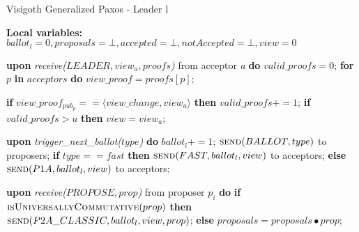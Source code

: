 \begin{algorithm} 
	\caption{Visigoth Generalized Paxos - Leader l}
	\label{VFT-Lead}
	\textbf{Local variables:} $ballot_l = 0,proposals = \bot, accepted = \bot, notAccepted = \bot, view = 0$
	\begin{algorithmic}[1]
		\State \textbf{upon} \textit{receive($LEADER,view_a,proofs$)} from acceptor \textit{a} \textbf{do}
		\State \hspace{\algorithmicindent} $valid\_proofs = 0$;
		\State \hspace{\algorithmicindent} \textbf{for} $p$ \textbf{in} $acceptors$ \textbf{do} 
		\State \hspace{\algorithmicindent}\hspace{\algorithmicindent} $view\_proof = proofs[p]$;
		
		\State \hspace{\algorithmicindent}\hspace{\algorithmicindent} \textbf{if} $view\_proof_{pub_p} == \langle view\_change, view_a \rangle$ \textbf{then}
		\State \hspace{\algorithmicindent}\hspace{\algorithmicindent}\hspace{\algorithmicindent}  $valid\_proofs \mathrel{+{=}} 1$;
		\State \hspace{\algorithmicindent} \textbf{if} $valid\_proofs > u$ \textbf{then}
		\State \hspace{\algorithmicindent}\hspace{\algorithmicindent} $view = view_a$;
		
		\State
		\State \textbf{upon} \textit{trigger\_next\_ballot($type$)} \textbf{do}
		\State \hspace{\algorithmicindent} $ballot_l \mathrel{+{=}} 1$;
		\State \hspace{\algorithmicindent} $\Call{send}{BALLOT,type}$ to proposers;
		\State \hspace{\algorithmicindent} \textbf{if} $type == fast$ \textbf{then}
		\State \hspace{\algorithmicindent}\hspace{\algorithmicindent} $\Call{send}{FAST,ballot_l,view}$ to acceptors;
		\State \hspace{\algorithmicindent} \textbf{else}
		\State \hspace{\algorithmicindent}\hspace{\algorithmicindent} $\Call{send}{P1A, ballot_l, view}$ to acceptors;
		
		\State
		\State \textbf{upon} \textit{receive($PROPOSE, prop$)} from proposer $p_i$ \textbf{do} 
		\State \hspace{\algorithmicindent} \textbf{if} $\Call{isUniversallyCommutative}{prop}$ \textbf{then}
		\State \hspace{\algorithmicindent}\hspace{\algorithmicindent} $\Call{send}{P2A\_CLASSIC, ballot_l,view, prop}$;
		\State \hspace{\algorithmicindent} \textbf{else}
		\State \hspace{\algorithmicindent}\hspace{\algorithmicindent} $proposals = proposals \bullet prop$;
		

\end{algorithmic}
\end{algorithm}
